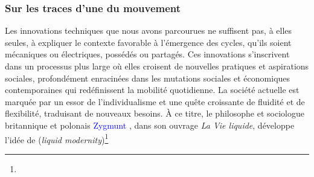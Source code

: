 \begin{refsegment}
\subsubsection*{Sur les traces d'une  du mouvement
    \label{chap1:mobilite-individuelle-legere-contexte-societes-liquides}
    }

Les innovations techniques que nous avons parcourues ne suffisent pas, à elles seules, à expliquer le contexte favorable à l’émergence des cycles, qu’ils soient mécaniques ou électriques, possédés ou partagés. Ces innovations s’inscrivent dans un processus plus large où elles croisent de nouvelles pratiques et aspirations sociales, profondément enracinées dans les mutations sociales et économiques contemporaines qui redéfinissent la mobilité quotidienne. La société actuelle est marquée par un essor de l’individualisme et une quête croissante de fluidité et de flexibilité, traduisant de nouveaux besoins. À ce titre, le philosophe et sociologue britannique et polonais \textcolor{blue}{Zygmunt} \textcolor{blue}{\textcite[7-28]{bauman_liquid_2000}}, dans son ouvrage \textsl{La Vie liquide}, développe l’idée de  (\textsl{liquid modernity})\footnote{
}
\end{refsegment}
